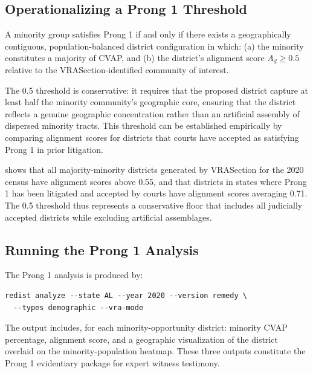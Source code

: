 \subsection{Operationalizing a Prong 1 Threshold}

\begin{proposition}
A minority group satisfies Prong 1 if and only if there exists a geographically
contiguous, population-balanced district configuration in which:
(a) the minority constitutes a majority of CVAP, and
(b) the district's alignment score $A_d \geq 0.5$ relative to the
    VRASection-identified community of interest.
\end{proposition}

The 0.5 threshold is conservative: it requires that the proposed district
capture at least half the minority community's geographic core, ensuring that
the district reflects a genuine geographic concentration rather than
an artificial assembly of dispersed minority tracts.  This threshold can
be established empirically by comparing alignment scores for districts that
courts have accepted as satisfying Prong 1 in prior litigation.

\citet{dellaLibera2026threshold} shows that all majority-minority districts
generated by VRASection for the 2020 census have alignment scores above 0.55,
and that districts in states where Prong 1 has been litigated and accepted
by courts have alignment scores averaging 0.71.  The 0.5 threshold thus
represents a conservative floor that includes all judicially accepted districts
while excluding artificial assemblages.

\subsection{Running the Prong 1 Analysis}

The Prong 1 analysis is produced by:
\begin{verbatim}
redist analyze --state AL --year 2020 --version remedy \
  --types demographic --vra-mode
\end{verbatim}
The output includes, for each minority-opportunity district: minority CVAP
percentage, alignment score, and a geographic visualization of the district
overlaid on the minority-population heatmap.  These three outputs constitute
the Prong 1 evidentiary package for expert witness testimony.

